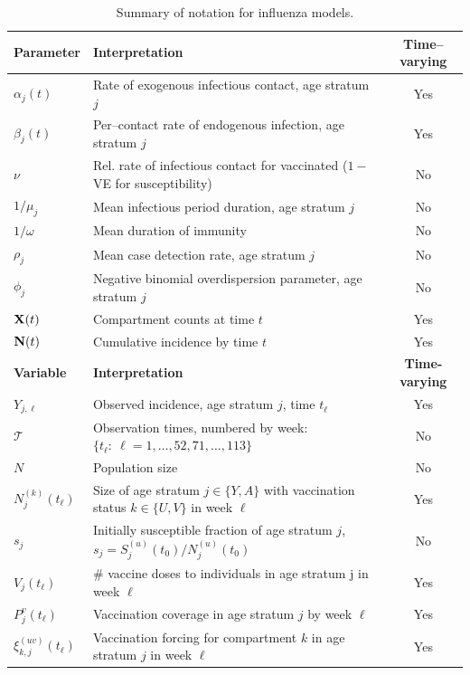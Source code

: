 \begin{table}[htbp]
	\caption{Summary of notation for influenza models.}
	\label{tab:flu_notation}
	\footnotesize
	\centering
	\begin{tabular}{llc}
		\hline
		\textbf{Parameter} & \textbf{Interpretation} & \textbf{Time--varying}\\
		\hline
		$\alpha_j(t)$ & Rate of exogenous infectious contact, age stratum $ j $ & Yes \\
		$ \beta_j(t) $ & Per--contact rate of endogenous infection, age stratum $ j $ & Yes \\
		$ \nu $ & Rel. rate of infectious contact for vaccinated ($ 1- $VE for susceptibility) & No \\
		$1/\mu_j$ & Mean infectious period duration, age stratum $ j $ & No\\
		$ 1/\omega $ & Mean duration of immunity & No \\
		$ \rho_j $ & Mean case detection rate, age stratum $ j $ & No\\
		$ \phi_j $ & Negative binomial overdispersion parameter, age stratum $ j $ & No \\
		$ \mathbf{X}(t) $ & Compartment counts at time $ t $ & Yes\\
		$ \mathbf{N}(t) $ & Cumulative incidence by time $ t $ & Yes \\
		\hline \hline
		\textbf{Variable} & \textbf{Interpretation} & \textbf{Time-varying}\\
		\hline		
		$ Y_{j,\ell} $ & Observed incidence, age stratum $ j $, time $ t_\ell $ & Yes \\
		$ \mathcal{T} $ & Observation times, numbered by week:  $ \lbrace t_\ell:\ \ell=1,\dots,52,71,\dots,113\rbrace $& No \\
		$ N$ & Population size & No\\
		$ N_{j}^{(k)}(t_\ell) $ & Size of age stratum $ j\in\lbrace Y, A\rbrace $ with vaccination status $ k\in\lbrace U,V\rbrace $ in week $ \ell $ & Yes \\
		$ s_{j} $ & Initially susceptible fraction of age stratum $ j $, $ s_j = S_j^{(u)}(t_0) / N_{j}^{(u)}(t_0) $ & No\\ 
		$ V_{j}(t_\ell) $ & \# vaccine doses to individuals in age stratum j in week $ \ell $ & Yes\\	
		$ P^v_{j}(t_\ell) $ & Vaccination coverage in age stratum $ j $ by week $ \ell $ & Yes \\
		$ \xi_{k,j}^{(uv)}(t_\ell) $ & Vaccination forcing for compartment $ k $ in age stratum $ j $ in week $ \ell $ & Yes\\

\end{tabular}
\end{table}
